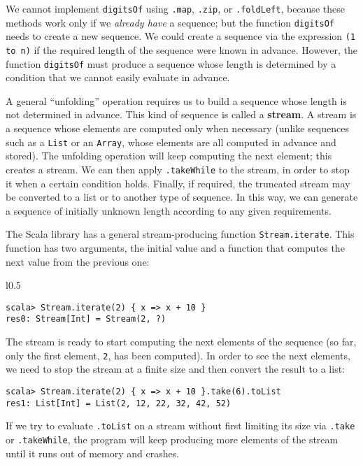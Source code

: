 \noindent We cannot implement \lstinline!digitsOf! using \lstinline!.map!,
\lstinline!.zip!, or \lstinline!.foldLeft!, because these methods
work only if we \emph{already have} a sequence; but the function \lstinline!digitsOf!
needs to create a new sequence. We could create a sequence via the
expression \lstinline!(1 to n)! if the required length of the sequence
were known in advance. However, the function \lstinline!digitsOf!
must produce a sequence whose length is determined by a condition
that we cannot easily evaluate in advance.

A general ``unfolding'' operation requires us to build a sequence
whose length is not determined in advance. This kind of sequence is
called a \textbf{stream}. A stream is a sequence whose
elements are computed only when necessary (unlike sequences such as
a \lstinline!List! or an \lstinline!Array!, whose elements are all
computed in advance and stored). The unfolding operation will keep
computing the next element; this creates a stream. We can then apply
\lstinline!.takeWhile! to the stream, in order to stop it when a
certain condition holds. Finally, if required, the truncated stream
may be converted to a list or to another type of sequence. In this
way, we can generate a sequence of initially unknown length according
to any given requirements.

The Scala library has a general stream-producing function \lstinline!Stream.iterate!.
This function has two arguments, the initial value and a function
that computes the next value from the previous one:

\begin{wrapfigure}{l}{0.5\columnwidth}%
\vspace{-0.7\baselineskip}
\begin{lstlisting}
scala> Stream.iterate(2) { x => x + 10 }
res0: Stream[Int] = Stream(2, ?)
\end{lstlisting}

\vspace{-1\baselineskip}
\end{wrapfigure}%

\noindent The stream is ready to start computing the next elements
of the sequence (so far, only the first element, \lstinline!2!, has
been computed). In order to see the next elements, we need to stop
the stream at a finite size and then convert the result to a list:
\begin{lstlisting}
scala> Stream.iterate(2) { x => x + 10 }.take(6).toList
res1: List[Int] = List(2, 12, 22, 32, 42, 52)
\end{lstlisting}
If we try to evaluate \lstinline!.toList! on a stream without first
limiting its size via \lstinline!.take! or \lstinline!.takeWhile!,
the program will keep producing more elements of the stream until
it runs out of memory and crashes.

